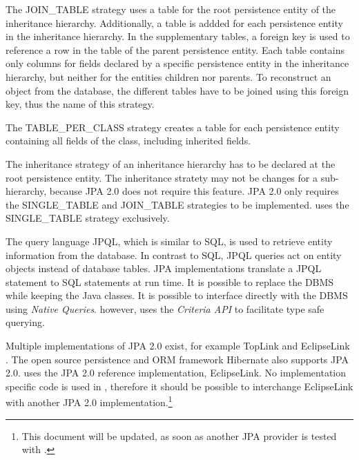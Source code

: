 The JOIN\_TABLE strategy uses a table for the root persistence entity of the inheritance hierarchy.
Additionally, a table is addded for each persistence entity in the inheritance hierarchy.
In the supplementary tables, a foreign key is used to reference a row in the table of the parent persistence entity.
Each table contains only columns for fields declared by a specific persistence entity in the inheritance hierarchy, but neither for the entities children nor parents.
To reconstruct an object from the database, the different tables have to be joined using this foreign key, thus the name of this strategy.

The TABLE\_PER\_CLASS strategy creates a table for each persistence entity containing all fields of the class, including inherited fields.

The inheritance strategy of an inheritance hierarchy has to be declared at the root persistence entity.
The inheritance stratety may not be changes for a sub-hierarchy, because JPA 2.0 does not require this feature.
JPA 2.0 only requires the SINGLE\_TABLE and JOIN\_TABLE strategies to be implemented.
\salespoint{} uses the SINGLE\_TABLE strategy exclusively.

The query language JPQL, which is similar to SQL, is used to retrieve entity information from the database.
In contrast to SQL, JPQL queries act on entity objects instead of database tables.
JPA implementations translate a JPQL statement to SQL statements at run time.
It is possible to replace the DBMS while keeping the Java classes.
It is possible to interface directly with the DBMS using \textit{Native Queries}.
\salespoint{} however, uses the \textit{Criteria API} \cite{jpa, eclipselink-javadoc} to facilitate type safe querying.

Multiple implementations of JPA 2.0 exist, for example TopLink \cite{toplink} and EclipseLink \cite{eclipselink}.
The open source persistence and ORM framework Hibernate \cite{hibernate} also supports JPA 2.0.
\salespoint{} uses the JPA 2.0 reference implementation, EclipseLink.
No implementation specific code is used in \salespoint{}, therefore it should be possible to interchange EclipseLink with another JPA 2.0 implementation.\footnote{This document will be updated, as soon as another JPA provider is tested with \salespoint{}.}

